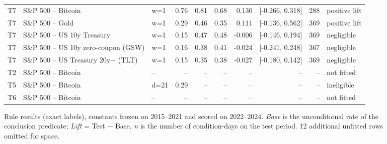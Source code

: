 \begin{figure}[t]
{\begin{tabular}{lllrrrrrrl}
T7 & S\&P 500 -- Bitcoin & w=1 & 0.76 & 0.81 & 0.68 & 0.130 & [-0.266, 0.318] & 288 & positive lift \\
T7 & S\&P 500 -- Gold & w=1 & 0.29 & 0.46 & 0.35 & 0.111 & [-0.136, 0.562] & 369 & positive lift \\
T7 & S\&P 500 -- US 10y Treasury & w=1 & 0.15 & 0.47 & 0.48 & -0.006 & [-0.146, 0.194] & 369 & negligible \\
T7 & S\&P 500 -- US 10y zero-coupon (GSW) & w=1 & 0.16 & 0.38 & 0.41 & -0.024 & [-0.241, 0.248] & 367 & negligible \\
T7 & S\&P 500 -- US Treasury 20y+ (TLT) & w=1 & 0.15 & 0.35 & 0.38 & -0.027 & [-0.180, 0.142] & 369 & negligible \\
T2 & S\&P 500 -- Bitcoin & -- & -- & -- & -- & -- & -- & -- & not fitted \\
T5 & S\&P 500 -- Bitcoin & d=21 & 0.29 & -- & -- & -- & -- & -- & ineligible \\
T6 & S\&P 500 -- Bitcoin & -- & -- & -- & -- & -- & -- & -- & not fitted \\
\bottomrule
\end{tabular}
}
\caption{Rule results (exact labels), constants frozen on 2015--2021 and scored on 2022--2024. \emph{Base} is the unconditional rate of the conclusion predicate; \emph{Lift} = Test $-$ Base. \emph{n} is the number of condition-days on the test period. 12 additional unfitted rows omitted for space.}
\label{tab:rule-results-pub}
\end{figure}
